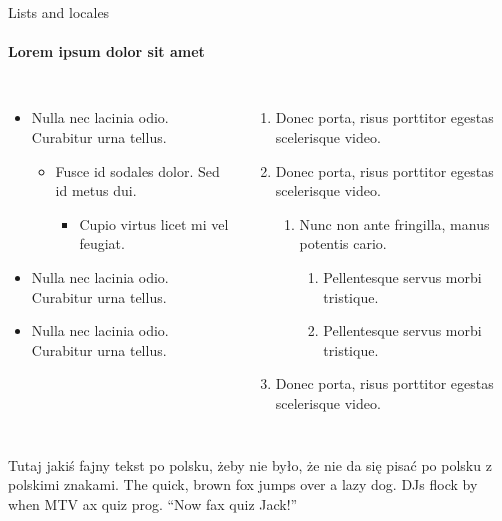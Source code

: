 \documentclass{beamer}
\begin{document}
\begin{frame}[label=lists]{Lists and locales}
    \framesubtitle{Lorem ipsum dolor sit amet}
    \begin{columns}[onlytextwidth]
        \begin{itemize}
        \item Nulla nec lacinia odio. Curabitur urna tellus.
        \begin{itemize}
            \item Fusce id sodales dolor. Sed id metus dui.
            \begin{itemize}
            \item Cupio virtus licet mi vel feugiat.
            \end{itemize}
        \end{itemize}
        \item Nulla nec lacinia odio. Curabitur urna tellus.
        \item Nulla nec lacinia odio. Curabitur urna tellus.
        \end{itemize}
        \begin{enumerate}
        \item Donec porta, risus porttitor egestas scelerisque video.
        \item Donec porta, risus porttitor egestas scelerisque video.
        \begin{enumerate}
            \item Nunc non ante fringilla, manus potentis cario.
            \begin{enumerate}
            \item Pellentesque servus morbi tristique.
            \item Pellentesque servus morbi tristique.
            \end{enumerate}
        \end{enumerate}
        \item Donec porta, risus porttitor egestas scelerisque video.
        \end{enumerate}
    \end{columns}
    \bigskip
    \justifying

    {Tutaj jakiś fajny tekst po polsku, żeby nie było, że
    nie da się pisać po polsku z polskimi znakami.}
    {The quick, brown fox jumps over a lazy
    dog. DJs flock by when MTV ax quiz prog. “Now fax quiz Jack!”}
\end{frame}
\end{document}
